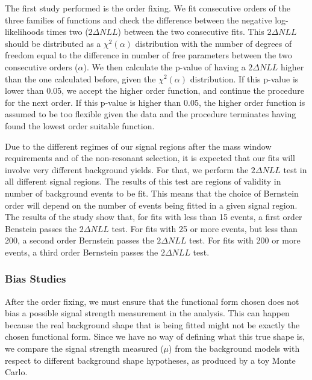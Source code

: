 
The first study performed is the order fixing. 
We fit consecutive orders of the three families of functions and check the difference between the negative log-likelihoods times two ($2\Delta NLL$) between the two consecutive fits. 
This $2\Delta NLL$ should be distributed as a $\chi^{2}(\alpha)$ distribution with the number of degrees of freedom equal to the difference in number of free parameters between the two consecutive orders ($\alpha$). 
We then calculate the p-value of having a $2\Delta NLL$ higher than the one calculated before, given the $\chi^{2}(\alpha)$ distribution. 
If this p-value is lower than 0.05, we accept the higher order function, and continue the procedure for the next order. 
If this p-value is higher than 0.05, the higher order function is assumed to be too flexible given the data and the procedure terminates having found the lowest order suitable function.

Due to the different regimes of our signal regions after the mass window requirements and of the non-resonant selection, it is expected that our fits will involve very different background yields. 
For that, we perform the $2\Delta NLL$ test in all different signal regions. 
The results of this test are regions of validity in number of background events to be fit. 
This means that the choice of Bernstein order will depend on the number of events being fitted in a given signal region. 
The results of the study show that, for fits with less than 15 events, a first order Benstein passes the $2\Delta NLL$ test. 
For fits with 25 or more events, but less than 200, a second order Bernstein passes the $2\Delta NLL$ test. 
For fits with 200 or more events, a third order Bernstein passes the $2\Delta NLL$ test. 

\subsubsection{Bias Studies}

After the order fixing, we must ensure that the functional form chosen does not bias a possible signal strength measurement in the analysis. This can happen because the real background shape that is being fitted might not be exactly the chosen functional form. Since we have no way of defining what this true shape is, we compare the signal strength measured ($\mu$) from the background models with respect to different background shape hypotheses, as produced by a toy Monte Carlo.

